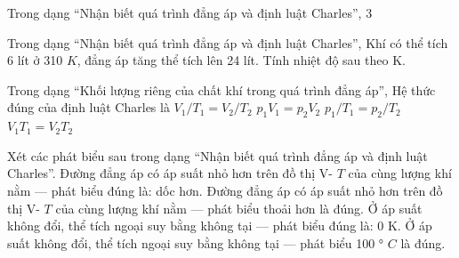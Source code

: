 \begin{ex}
Trong dạng “Nhận biết quá trình đẳng áp và định luật Charles”, 3
\choiceTF

\end{ex}

\begin{ex}
Trong dạng “Nhận biết quá trình đẳng áp và định luật Charles”, Khí có thể tích 6 lít ở 310 $K$, đẳng áp tăng thể tích lên 24 lít. Tính nhiệt độ sau theo K.
\end{ex}

\begin{ex}
Trong dạng “Khối lượng riêng của chất khí trong quá trình đẳng áp”, Hệ thức đúng của định luật Charles là
\choice
{\True $V_1/T_1=V_2/T_2$}
{$p_1V_1=p_2V_2$}
{$p_1/T_1=p_2/T_2$}
{$V_1T_1=V_2T_2$}
\end{ex}

\begin{ex}
Xét các phát biểu sau trong dạng “Nhận biết quá trình đẳng áp và định luật Charles”.
\choiceTF
{\True Đường đẳng áp có áp suất nhỏ hơn trên đồ thị V- $T$ của cùng lượng khí nằm — phát biểu đúng là: dốc hơn.}
{Đường đẳng áp có áp suất nhỏ hơn trên đồ thị V- $T$ của cùng lượng khí nằm — phát biểu thoải hơn là đúng.}
{\True Ở áp suất không đổi, thể tích ngoại suy bằng không tại — phát biểu đúng là: 0 K.}
{Ở áp suất không đổi, thể tích ngoại suy bằng không tại — phát biểu 100 ° $C$ là đúng.}
\end{ex}


